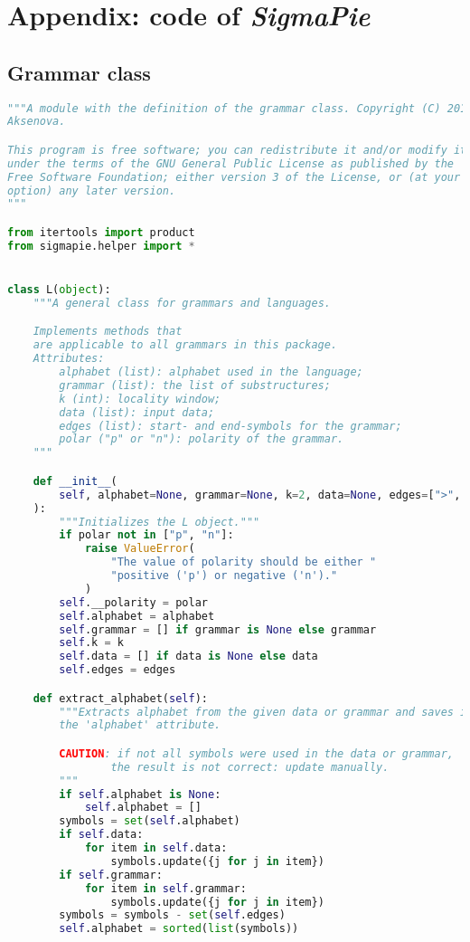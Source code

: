 \newpage
\section*{Appendix: code of \emph{SigmaPie}}

\subsection*{Grammar class}

\begin{lstlisting}[language=Python]
"""A module with the definition of the grammar class. Copyright (C) 2019  Alena
Aksenova.

This program is free software; you can redistribute it and/or modify it
under the terms of the GNU General Public License as published by the
Free Software Foundation; either version 3 of the License, or (at your
option) any later version.
"""

from itertools import product
from sigmapie.helper import *


class L(object):
    """A general class for grammars and languages.

    Implements methods that
    are applicable to all grammars in this package.
    Attributes:
        alphabet (list): alphabet used in the language;
        grammar (list): the list of substructures;
        k (int): locality window;
        data (list): input data;
        edges (list): start- and end-symbols for the grammar;
        polar ("p" or "n"): polarity of the grammar.
    """

    def __init__(
        self, alphabet=None, grammar=None, k=2, data=None, edges=[">", "<"], polar="p"
    ):
        """Initializes the L object."""
        if polar not in ["p", "n"]:
            raise ValueError(
                "The value of polarity should be either "
                "positive ('p') or negative ('n')."
            )
        self.__polarity = polar
        self.alphabet = alphabet
        self.grammar = [] if grammar is None else grammar
        self.k = k
        self.data = [] if data is None else data
        self.edges = edges

    def extract_alphabet(self):
        """Extracts alphabet from the given data or grammar and saves it into
        the 'alphabet' attribute.

        CAUTION: if not all symbols were used in the data or grammar,
                the result is not correct: update manually.
        """
        if self.alphabet is None:
            self.alphabet = []
        symbols = set(self.alphabet)
        if self.data:
            for item in self.data:
                symbols.update({j for j in item})
        if self.grammar:
            for item in self.grammar:
                symbols.update({j for j in item})
        symbols = symbols - set(self.edges)
        self.alphabet = sorted(list(symbols))


\end{lstlisting}
